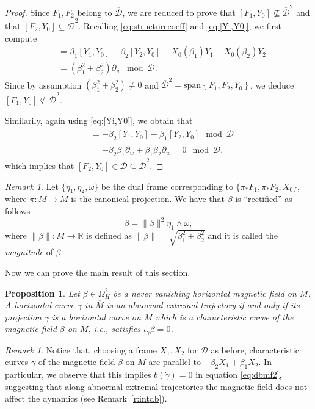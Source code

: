 \documentclass{amsart}
\theoremstyle{plain}
\newtheorem{proposition}[theorem]{Proposition}
\theoremstyle{definition}
\theoremstyle{remark}
\newtheorem{remark}[thm]{Remark}
\newcommand{\R}{\mathbb{R}}
\newcommand{\p}{\partial}												%
\newcommand{\distr}{\mathcal{D}}								%
\newcommand{\B}{\beta}
\newcommand{\lift}[1]{\overline{#1}} 							%
\begin{document}
\begin{proof}
Since $F_1,F_2$ belong to $\lift\distr$, we are reduced to prove that $[F_1,Y_0]\not\subseteq\lift\distr^2$ and that $[F_2,Y_0]\subseteq\lift\distr^2$.
Recalling \eqref{eq:structurecoeff} and \eqref{eq:[Yi,Y0]}, we first compute
\begin{align}
[F_1,Y_0] &=\B_1[Y_1,Y_0]+\B_2[Y_2,Y_0] %
-X_0\left(\B_1\right)Y_1-X_0\left(\B_2\right)Y_2\\
&=\left(\B_1^2+\B_2^2\right)\p_w\mod \lift\distr.
\end{align}
Since by assumption $\left(\B_1^2+\B_2^2\right)\neq0$ and  $\lift{\distr}^2 = \mathrm{span}\left\{F_1,F_2,Y_0\right\}$, we deduce $[F_1,Y_0]\not\subseteq \lift\distr^2$.

Similarily, again using  \eqref{eq:[Yi,Y0]}, we obtain that
\begin{align}
[F_2,Y_0]&=-\B_2[Y_1,Y_0]+\B_1[Y_2,Y_0] \mod \lift\distr\\
&=-\B_2\B_1\p_w +\B_1\B_2\p_w=0 \mod \lift\distr.
\end{align}
which implies that $[F_2,Y_0] \in \lift \distr\subseteq \lift\distr^2$.
\end{proof}
\begin{remark} \label{r:rango1} 
Let  $\{\eta_1,\eta_{2},\omega\}$ be the dual frame corresponding to $\{\pi_*F_1,\pi_*F_2,X_0\}$, where $\pi:\lift M \to M$ is the canonical projection. We have that $\beta$ is ``rectified''  as follows
\begin{equation}
	\B=\|\B\|^2\eta_1\wedge\omega ,
\end{equation}
where $\|\B\|:M\to\R$ is defined as $\|\B\|=\sqrt{\B_1^2+\B_2^2}$ and it is called the \emph{magnitude} of $\B$.
\end{remark}
Now we can prove the main result of this section.
\begin{proposition}
\label{lem:abnormalsinBneq0}
Let $\B\in \Omega^2_H$ be a never vanishing horizontal magnetic field on $M$. 
A horizontal curve $\lift \gamma$ in $ \lift M$ is  an abnormal extremal trajectory if and only if its projection $\gamma$ is a horizontal curve on $M$ which is a characteristic curve of the magnetic field $\beta$ on $M$, i.e., satisfies $\iota_{\dot \gamma}\beta=0$. 
\end{proposition}


\begin{remark}
Notice that, choosing a frame $X_{1},X_{2}$ for $\distr$ as before, characteristic curves $\gamma$ of the magnetic field $\beta$ on $M$ are parallel to $-\B_2X_1+\B_1X_2$. In particular, we observe that this implies $b(\dot \gamma)=0$ in equation \eqref{eq:dbmf2}, suggesting that along abnormal extremal trajectories the magnetic field does not affect the dynamics (see Remark~\ref{r:intdb}).
\end{remark}
\end{document}
